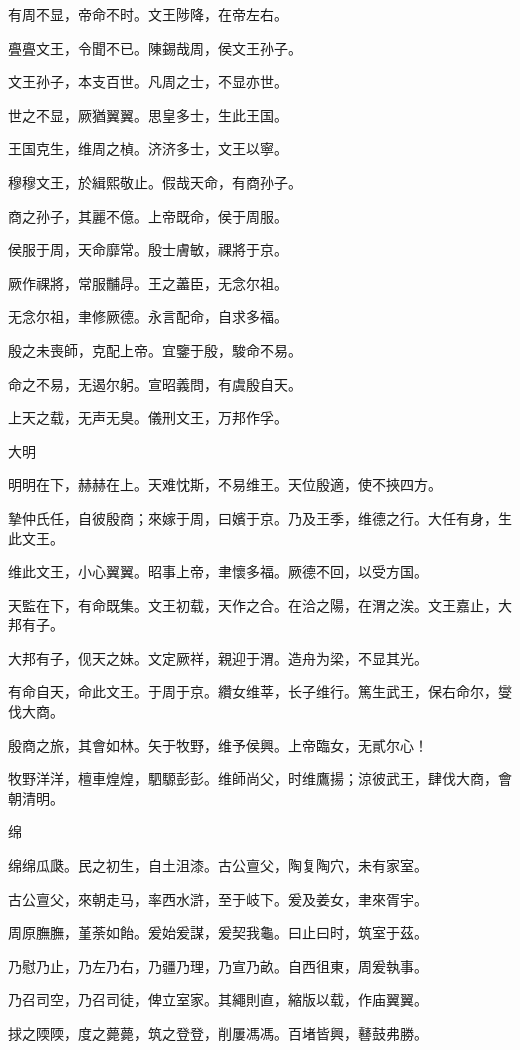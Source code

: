 有周不显，帝命不时。文王陟降，在帝左右。

亹亹文王，令聞不已。陳錫哉周，侯文王孙子。

文王孙子，本支百世。凡周之士，不显亦世。

世之不显，厥猶翼翼。思皇多士，生此王国。

王国克生，维周之楨。济济多士，文王以寧。

穆穆文王，於緝熙敬止。假哉天命，有商孙子。

商之孙子，其麗不億。上帝既命，侯于周服。

侯服于周，天命靡常。殷士膚敏，祼將于京。

厥作祼將，常服黼冔。王之藎臣，无念尔祖。

无念尔祖，聿修厥德。永言配命，自求多福。

殷之未喪師，克配上帝。宜鑒于殷，駿命不易。

命之不易，无遏尔躬。宣昭義問，有虞殷自天。

上天之载，无声无臭。儀刑文王，万邦作孚。

大明

明明在下，赫赫在上。天难忱斯，不易维王。天位殷適，使不挾四方。

摯仲氏任，自彼殷商；來嫁于周，曰嬪于京。乃及王季，维德之行。大任有身，生此文王。

维此文王，小心翼翼。昭事上帝，聿懷多福。厥德不回，以受方国。

天監在下，有命既集。文王初载，天作之合。在洽之陽，在渭之涘。文王嘉止，大邦有子。

大邦有子，伣天之妹。文定厥祥，親迎于渭。造舟为梁，不显其光。

有命自天，命此文王。于周于京。纘女维莘，长子维行。篤生武王，保右命尔，燮伐大商。

殷商之旅，其會如林。矢于牧野，维予侯興。上帝臨女，无貳尔心！

牧野洋洋，檀車煌煌，駟騵彭彭。维師尚父，时维鷹揚；涼彼武王，肆伐大商，會朝清明。

绵

绵绵瓜瓞。民之初生，自土沮漆。古公亶父，陶复陶穴，未有家室。

古公亶父，來朝走马，率西水滸，至于岐下。爰及姜女，聿來胥宇。

周原膴膴，堇荼如飴。爰始爰謀，爰契我龜。曰止曰时，筑室于茲。

乃慰乃止，乃左乃右，乃疆乃理，乃宣乃畝。自西徂東，周爰執事。

乃召司空，乃召司徒，俾立室家。其繩則直，縮版以载，作庙翼翼。

捄之陾陾，度之薨薨，筑之登登，削屢馮馮。百堵皆興，鼛鼓弗勝。

